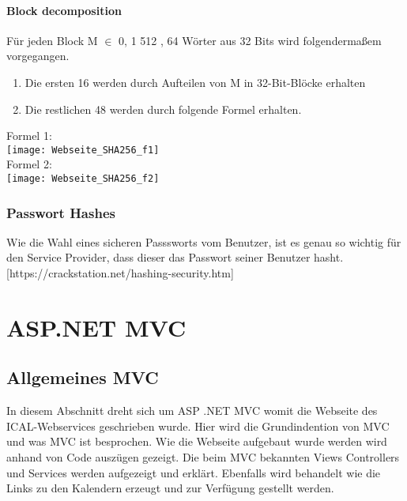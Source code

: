 {\subsubsection{Block decomposition}
\label{sec:hash_block_deco}
Für jeden Block M $\in$ {0, 1} 512 , 64 Wörter aus 32 Bits wird folgendermaßem vorgegangen. 
\begin{enumerate}
\item Die ersten 16 werden durch Aufteilen von M in 32-Bit-Blöcke erhalten
\item Die restlichen 48 werden durch folgende Formel erhalten.
\end{enumerate}
Formel 1:
\\
\texttt{[image: Webseite\_SHA256\_f1]}
\\Formel 2:\\
\texttt{[image: Webseite\_SHA256\_f2]}
\\
\textcite{sha256}
\subsection{Passwort Hashes}
\label{sec:pwdhash}
Wie die Wahl eines sicheren Passsworts vom Benutzer, ist es genau so wichtig für den Service Provider, dass dieser das Passwort seiner Benutzer hasht.
[https://crackstation.net/hashing-security.htm]
\chapter{ASP.NET MVC}
\label{sec:MVC}
\section{Allgemeines MVC}
\label{sec:allgemein}
In diesem Abschnitt dreht sich um ASP .NET MVC womit die Webseite des ICAL-Webservices geschrieben wurde. Hier wird die Grundindention von MVC und was MVC ist besprochen. Wie die Webseite aufgebaut wurde werden wird anhand von Code auszügen gezeigt. Die beim MVC bekannten Views Controllers und Services werden aufgezeigt und erklärt. Ebenfalls wird behandelt wie die Links zu den Kalendern erzeugt und zur Verfügung gestellt werden. 
}
